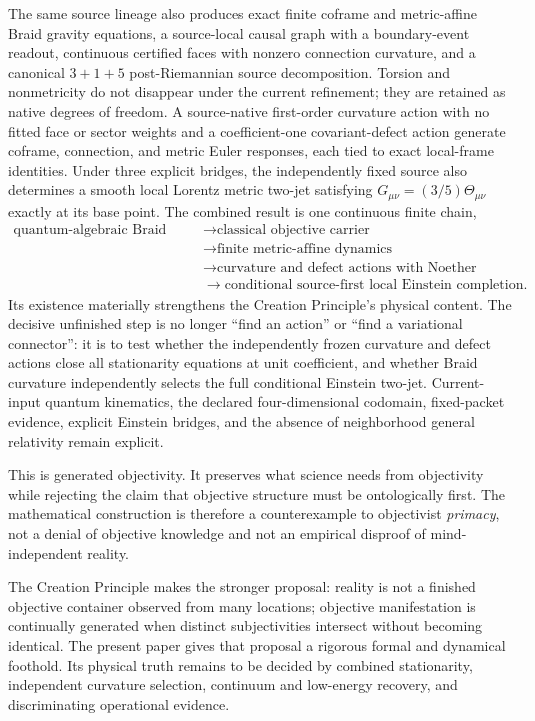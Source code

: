\documentclass[11pt]{article}
\theoremstyle{definition}
\theoremstyle{remark}
\begin{document}
The same source lineage also produces exact finite coframe and metric-affine Braid gravity equations, a source-local causal graph with a boundary-event readout, continuous certified faces with nonzero connection curvature, and a canonical $3+1+5$ post-Riemannian source decomposition. Torsion and nonmetricity do not disappear under the current refinement; they are retained as native degrees of freedom. A source-native first-order curvature action with no fitted face or sector weights and a coefficient-one covariant-defect action generate coframe, connection, and metric Euler responses, each tied to exact local-frame identities. Under three explicit bridges, the independently fixed source also determines a smooth local Lorentz metric two-jet satisfying $G_{\mu\nu}=(3/5)\Theta_{\mu\nu}$ exactly at its base point. The combined result is one continuous finite chain,
\[
 \begin{aligned}
 \text{quantum-algebraic Braid source}
 &\longrightarrow \text{classical objective carrier}\\
 &\longrightarrow \text{finite metric-affine dynamics}\\
 &\longrightarrow \text{curvature and defect actions with Noether identities}\\
 &\longrightarrow \text{conditional source-first local Einstein completion}.
 \end{aligned}
\]
Its existence materially strengthens the Creation Principle's physical content. The decisive unfinished step is no longer ``find an action'' or ``find a variational connector'': it is to test whether the independently frozen curvature and defect actions close all stationarity equations at unit coefficient, and whether Braid curvature independently selects the full conditional Einstein two-jet. Current-input quantum kinematics, the declared four-dimensional codomain, fixed-packet evidence, explicit Einstein bridges, and the absence of neighborhood general relativity remain explicit.

This is generated objectivity. It preserves what science needs from objectivity while rejecting the claim that objective structure must be ontologically first. The mathematical construction is therefore a counterexample to objectivist \emph{primacy}, not a denial of objective knowledge and not an empirical disproof of mind-independent reality.

The Creation Principle makes the stronger proposal: reality is not a finished objective container observed from many locations; objective manifestation is continually generated when distinct subjectivities intersect without becoming identical. The present paper gives that proposal a rigorous formal and dynamical foothold. Its physical truth remains to be decided by combined stationarity, independent curvature selection, continuum and low-energy recovery, and discriminating operational evidence.
\end{document}
